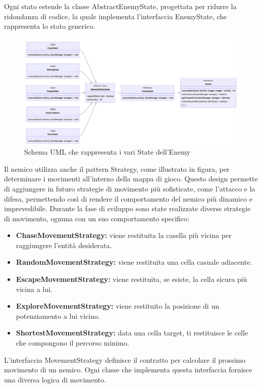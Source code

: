 \documentclass[a4paper,12pt]{report}
\begin{document}
\par
Ogni stato estende la classe AbstractEnemyState, progettata per ridurre la ridondanza di codice, la quale implementa l’interfaccia EnemyState, che rappresenta lo stato generico.

\begin{figure}[h]
\centering{}
\includegraphics[width=\textwidth]{img/enemyState.png}
\caption{Schema UML che rappresenta i vari State dell'Enemy}
\end{figure}

\par
Il nemico utilizza anche il pattern Strategy, come illustrato in figura, per determinare i movimenti all’interno della mappa di gioco. Questo design permette di aggiungere in futuro strategie di movimento più sofisticate, come l’attacco e la difesa, permettendo così di rendere il comportamento del nemico più dinamico e imprevedibile. Durante la fase di sviluppo sono state realizzate diverse strategie di movimento, ognuna con un suo comportamento specifico: 
\begin{itemize}
 \item \textbf{ChaseMovementStrategy:} viene restituita la casella più vicina per raggiungere l’entità desiderata.
 \item \textbf{RandomMovementStrategy:} viene restituita una cella casuale adiacente.
 \item \textbf{EscapeMovementStrategy:} viene restituita, se esiste, la cella sicura più vicina a lui.
 \item \textbf{ExploreMovementStrategy:} viene restituito la posizione di un potenziamento a lui vicino.
 \item \textbf{ShortestMovementStrategy:} data una cella target, ti restituisce le celle che compongono il percorso minimo.
\end{itemize}

\par
L'interfaccia MovementStrategy definisce il contratto per calcolare il prossimo movimento di un nemico. Ogni classe che implementa questa interfaccia fornisce una diversa logica di movimento. 
\end{document}
